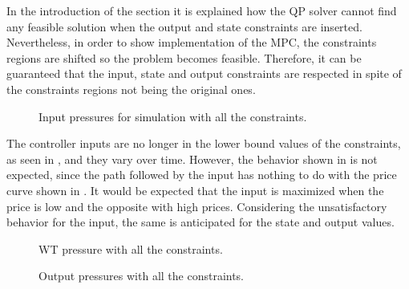 In the introduction of the section it is explained how the QP solver cannot find any feasible solution when the output and state constraints are inserted. Nevertheless, in order to show implementation of the MPC, the constraints regions are shifted so the problem becomes feasible. Therefore, it can be guaranteed that the input, state and output constraints are respected in spite of the constraints regions not being the original ones. 

\begin{figure}[H]
\centering
 
\caption{Input pressures for simulation with all the constraints.}
\label{fig:Output_input}
\end{figure}

The controller inputs are no longer in the lower bound values of the constraints, as seen in , and they vary over time. However, the behavior shown in  is not expected, since the path followed by the input has nothing to do with the price curve shown in . It would be expected that the input is maximized when the price is low and the opposite with high prices. Considering the unsatisfactory behavior for the input, the same is anticipated for the state and output values. 

\begin{figure}[H]
\centering
 
\caption{WT pressure with all the constraints.}
\label{fig:Output_input}
\end{figure}

\begin{figure}[H]
\centering
 
\caption{Output pressures with all the constraints.}
\label{fig:Output_input}
\end{figure}



